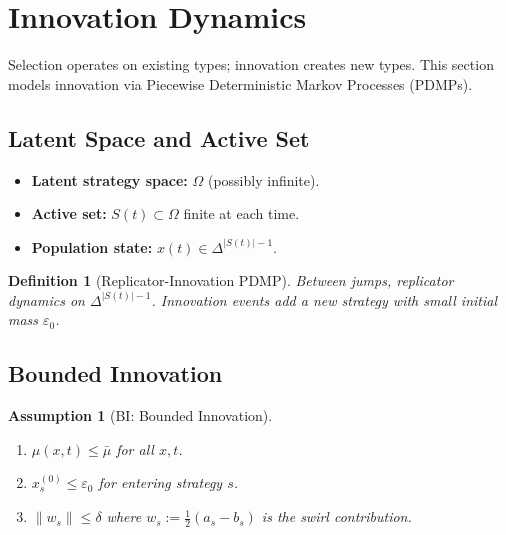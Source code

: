 \documentclass[12pt]{article}
\newtheorem{definition}[theorem]{Definition}
\newtheorem{assumption}[theorem]{Assumption}
\begin{document}

\section{Innovation Dynamics}
\label{sec:innovation-pdmp}

Selection operates on existing types; innovation creates new types. This section models innovation via Piecewise Deterministic Markov Processes (PDMPs).

\subsection{Latent Space and Active Set}

\begin{itemize}
    \item \textbf{Latent strategy space:} $\Omega$ (possibly infinite).
    \item \textbf{Active set:} $S(t) \subset \Omega$ finite at each time.
    \item \textbf{Population state:} $x(t) \in \Delta^{|S(t)| - 1}$.
\end{itemize}

\begin{definition}[Replicator-Innovation PDMP]
Between jumps, replicator dynamics on $\Delta^{|S(t)| - 1}$. Innovation events add a new strategy with small initial mass $\varepsilon_0$.
\end{definition}

\subsection{Bounded Innovation}

\begin{assumption}[BI: Bounded Innovation]
\begin{enumerate}
    \item $\mu(x, t) \leq \bar{\mu}$ for all $x, t$.
    \item $x_s^{(0)} \leq \varepsilon_0$ for entering strategy $s$.
    \item $\|w_s\| \leq \delta$ where $w_s := \frac{1}{2}(a_s - b_s)$ is the swirl contribution.
\end{enumerate}
\end{assumption}
\end{document}
